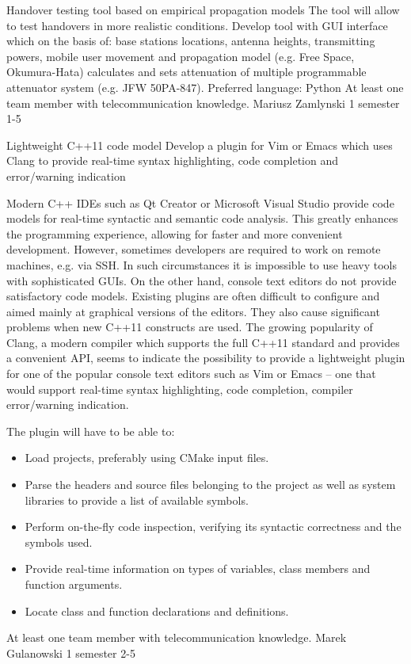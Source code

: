 \begin{project}
{Handover testing tool based on empirical propagation models}
{The tool will allow to test handovers in more realistic conditions.} 
{ 
Develop tool with GUI interface which on the basis of: base stations locations, antenna heights, transmitting powers, mobile user movement and propagation model (e.g. Free Space, Okumura-Hata) calculates and sets attenuation of multiple programmable attenuator system (e.g. JFW 50PA-847).
}
{Preferred language: Python\newline
At least one team member with telecommunication knowledge.}
{Mariusz Zamlynski}
{1 semester}
{1-5}
\end{project}
\begin{project}
{Lightweight C++11 code model}
{Develop a plugin for Vim or Emacs which uses Clang to provide real-time
syntax highlighting, code completion and error/warning indication} 
{ 
Modern C++ IDEs such as Qt Creator or Microsoft Visual Studio provide code
models for real-time syntactic and semantic code analysis. This greatly enhances 
the programming experience, allowing for faster and more convenient development. 
However, sometimes developers are required to work on remote machines, e.g. via SSH. 
In such circumstances it is impossible to use heavy tools with sophisticated GUIs. 
On the other hand, console text editors do not provide satisfactory code models. 
Existing plugins are often difficult to configure and aimed mainly at graphical versions of the editors. 
They also cause significant problems when new C++11 constructs are used. The growing popularity of Clang,
a modern compiler which supports the full C++11 standard and provides a convenient API, seems to indicate 
the possibility to provide a lightweight plugin for one of the popular console text editors such as Vim or 
Emacs – one that would support real-time syntax highlighting, code completion, compiler error/warning indication. 
 
The plugin will have to be able to:
\begin{itemize}
	\item Load projects, preferably using CMake input files.
	\item Parse the headers and source files belonging to the project as well as
	system libraries to provide a list of available symbols.
	\item Perform on-the-fly code inspection, verifying its syntactic correctness and the symbols used.
	\item Provide real-time information on types of variables, class members and function arguments.
	\item Locate class and function declarations and definitions.
\end{itemize} 
 }
{At least one team member with telecommunication knowledge.}
{Marek Gulanowski}
{1 semester}
{2-5}
\end{project}
